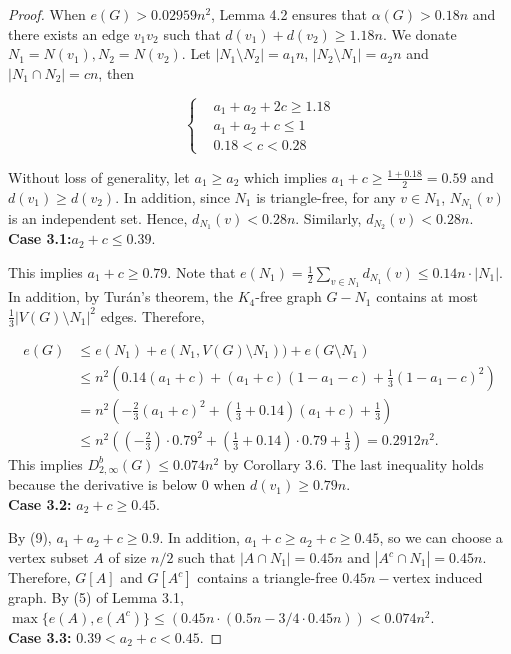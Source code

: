 \documentclass[11pt, oneside]{article}   	%
\begin{document}
\begin{proof}
    When $e(G)>0.02959n^2$, Lemma 4.2 ensures that $\alpha(G)>0.18 n$ and there exists an edge $v_1 v_2$ such that $d(v_1)+d(v_2)\geq 1.18n$. We donate $N_1=N(v_1),N_2=N(v_2)$. Let $|N_1\setminus N_2|=a_1 n$, $|N_2\setminus N_1|=a_2 n$ and $|N_1\cap N_2|=c n$, then
    
    \begin{equation}
    \begin{cases}
         & a_1+a_2+2c\geq 1.18\\
         & a_1+a_2+c\leq 1   \\
         & 0.18< c < 0.28
    \end{cases}
    \end{equation}
    
    Without loss of generality, let $a_1\geq a_2$ which implies $a_1+c\geq \frac{1+0.18}{2}=0.59$ and $d(v_1)\geq d(v_2)$. In addition, since $N_1$ is triangle-free, for any $v\in N_1$, $N_{N_1}(v)$ is an independent set. Hence, $d_{N_1}(v)< 0.28n$. Similarly, $d_{N_2}(v)< 0.28n$.  
\\
\textbf{Case 3.1:}$a_2+c\leq 0.39$. 

This implies $a_1+c\geq 0.79$. Note that $e(N_1)= \frac 1 2\sum_{v\in N_1} d_{N_1}(v)\leq 0.14n\cdot |N_1|$. In addition, by Turán's theorem, the $K_4$-free graph $G- N_1$ contains at most $\frac1 3|V(G)\setminus N_1|^2$ edges. Therefore,

$$
\begin{aligned}
    e(G) & \leq e(N_1)+e(N_1,V(G)\setminus N_1))+e(G\setminus N_1) \\
    &\leq n^2(0.14(a_1+c)+(a_1+c)(1-a_1-c)+\frac 1 3 (1-a_1-c)^2)\\
    &=n^2\left(-\frac{2}{3}(a_1+c)^2+(\frac{1}{3}+0.14)(a_1+c)+\frac{1}{3}\right)\\
    &\leq n^2\left((-\frac{2}{3})\cdot0.79^2+(\frac{1}{3}+0.14)\cdot0.79+\frac{1}{3}\right) =0.2912 n^2.
\end{aligned}
$$
This implies $D_{2,\infty}^b(G)\leq 0.074n^2$ by Corollary 3.6. The last inequality holds because the derivative is below 0 when $d(v_1)\geq 0.79n$.\\
\textbf{Case 3.2:} $a_2+c\geq 0.45$. 

By (9), $a_1+a_2+c\geq 0.9$. In addition, $a_1+c\geq a_2+c\geq 0.45$, so we can choose a vertex subset $A$ of size $n/2$ such that $|A\cap N_1|=0.45n$ and $|A^c\cap N_1|=0.45n$. Therefore, $G[A]$ and $G[A^c]$ contains a triangle-free $0.45n-$vertex induced graph. By (5) of Lemma 3.1, $\max\{e(A),e(A^c) \}\leq (0.45n\cdot (0.5n-3/4\cdot 0.45n))<0.074 n^2.$
\\
\textbf{Case 3.3:} $0.39<a_2+c<0.45$. 


\end{proof}
\end{document}
